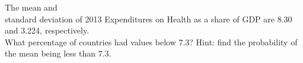 \documentclass[11pt]{book}\usepackage[]{graphicx}\usepackage[]{color}
\begin{document}
\begin{exercises}
%
%
%
%
%
%
%
%
%










		\begin{exercise}  %

	  The mean and \\ standard  deviation of 2013 Expenditures on Health as a share of GDP are 8.30 and 3.224, respectively.  \\ What percentage of countries had values below 7.3?   Hint: find the probability of the mean being less than 7.3.


\end{exercise}
\end{exercises}
\end{document}
